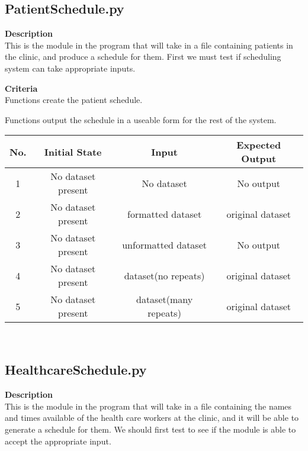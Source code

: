 \documentclass[12pt]{article}
\begin{document}
\subsection{PatientSchedule.py} 

\textbf{Description}\\

This is the module in the program that will take in a file containing patients in the clinic, and produce a schedule for them. First we must test if scheduling system can take appropriate inputs.

\quad

\textbf{Criteria}\\

Functions create the patient schedule.

Functions output the
schedule in a useable form for the rest of the system.\\

\quad


	
	
\begin{tabular}{|c|c|c|c|}
\hline
\textbf{No.}  & \textbf{Initial State} & \textbf{Input} & \textbf{Expected Output} 
\\ \hline
1  & No dataset present & No dataset & No output 
\\ \hline
2  & No dataset present & formatted dataset & original dataset 
\\ \hline
3  & No dataset present & unformatted dataset & No output 
\\ \hline
4  & No dataset present & dataset(no repeats) & original dataset 
\\ \hline
5  & No dataset present & dataset(many repeats) & original dataset
\\ \hline
\end{tabular}\\

\quad

\quad

		
\subsection{HealthcareSchedule.py} 

\textbf{Description}\\

This is the module in the program that will take in a file containing the names and times available of the health care workers at the clinic, and it will be able to generate a schedule for them. We should first test to see if the module is able to accept the appropriate input.
\end{document}
